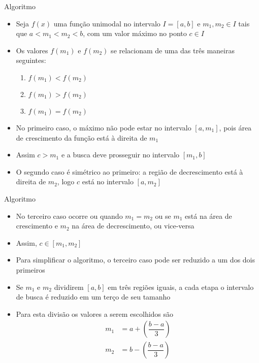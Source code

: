 \begin{frame}[fragile]{Algoritmo}

    \begin{itemize}
        \item Seja $f(x)$ uma função unimodal no intervalo $I = [a, b]$ e $m_1, m_2\in I$ tais
            que $a < m_1 < m_2 < b$, com um valor máximo no ponto $c\in I$

        \item Os valores $f(m_1)$ e $f(m_2)$ se relacionam de uma das três maneiras seguintes:
        \begin{enumerate}
            \item $f(m_1) < f(m_2)$
            \item $f(m_1) > f(m_2)$
            \item $f(m_1) = f(m_2)$
        \end{enumerate}

        \item No primeiro caso, o máximo não pode estar no intervalo $[a, m_1]$, pois 
            área de crescimento da função está à direita de $m_1$

        \item Assim $c > m_1$ e a busca deve prosseguir no intervalo $[m_1, b]$

        \item O segundo caso é simétrico ao primeiro: a região de decrescimento está à 
            direita de $m_2$, logo $c$ está no intervalo $[a, m_2]$
    \end{itemize}

\end{frame}

\begin{frame}[fragile]{Algoritmo}

    \begin{itemize}
        \item No terceiro caso ocorre ou quando $m_1 = m_2$ ou se $m_1$ está na área de crescimento
            e $m_2$ na área de decrescimento, ou vice-versa

        \item Assim, $c\in [m_1, m_2]$

        \item Para simplificar o algoritmo, o terceiro caso pode ser reduzido a um dos dois
            primeiros

        \item Se $m_1$ e $m_2$ dividirem $[a, b]$ em três regiões iguais, a cada etapa
            o intervalo de busca é reduzido em um terço de seu tamanho

        \item Para esta divisão os valores a serem escolhidos são
        \begin{align*}
            m_1 &= a + \left(\dfrac{b - a}{3}\right) \\
            m_2 &= b - \left(\dfrac{b - a}{3}\right)
        \end{align*}
    \end{itemize}

\end{frame}

